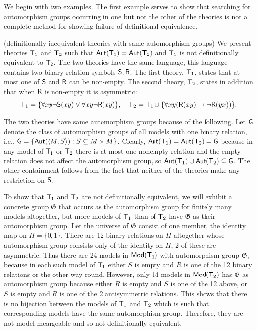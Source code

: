 \documentclass[12pt,leqno]{article}
\newcommand{\Gg}{\mbox{$\mathfrak G$}}
\newcommand{\Aut}{\mbox{\sf Aut}}
\newcommand{\T}{\mbox{\sf T}}
\newcommand{\Mod}{\mbox{\sf Mod}}
\newcommand{\R}{\mbox{\sf R}}
\newcommand{\Es}{\mbox{\sf S}}
\newcommand{\G}{\mbox{\sf G}}
\begin{document}
We begin with two examples. The first example serves to show that
searching for automorphism groups occurring in one but not the other
of the theories is not a complete method for showing failure of
definitional equivalence. %
\bigskip

(definitionally inequivalent theories
with same automorphism groups) We present theories $\T_1$ and
$\T_2$ such that $\Aut(\T_1)=\Aut(\T_2)$ and $\T_1$ is not
definitionally equivalent to $\T_2$. The two theories have the same
language, this language contains two binary relation symbols $\Es,
\R$.  The first theory, $\T_1$, states that at most one of $\Es$ and
$\R$ can be non-empty. The second theory, $\T_2$, states in addition
that when $\R$ is non-empty it is asymmetric:
\[ \T_1=\{ \forall xy\lnot\Es(xy)\lor\forall xy\lnot\R(xy)\}, \quad
\T_2=\T_1\cup\{\forall xy(\R(xy)\to\lnot\R(yx))\} .\]

The two theories have same automorphism groups because of the following. 
Let $\G$ denote
the class of automorphism groups of all models with one binary
relation, i.e., $\G=\{\Aut(\langle M,S\rangle) : S\subseteq M\times
M\}$. Clearly, $\Aut(\T_1)=\Aut(\T_2)=\G$ because in any model of
$\T_1$ or $\T_2$ there is at most one nonempty relation and the
empty relation does not affect the automorphism group, so
$\Aut(\T_1)\cup\Aut(\T_2)\subseteq\G$. The other containment follows
from the fact that neither of the theories make any restriction on
$\Es$.

To show that $\T_1$ and $\T_2$ are not definitionally equivalent, we
will exhibit a  concrete group  $\Gg$ that occurs as the
automorphism group for finitely many models altogether, but more
models of $\T_1$ than of $\T_2$ have $\Gg$ as their automorphism
group. 
Let the universe of $\Gg$ consist of one member, the identity
map on $H=\{ 0,1\}$. There are 12 binary relations on $H$ altogether
whose automorphism group consists only of the identity on $H$, 2 of
these are asymmetric. Thus there are 24 models in $\Mod(\T_1)$ with
automorphism group $\Gg$, because in each such model of $\T_1$ either $S$ is 
empty and $R$ is one of the 12 binary relations or the other way round. 
However, only 14 models in $\Mod(\T_2)$ has
$\Gg$ as automorphism group because either $R$ is empty and $S$ is one of 
the 12 above, or $S$ is empty and $R$ is one of the 2 antisymmetric relations.
This shows that there is no bijection between the models  of $\T_1$ and $\T_2$ 
which %
is such that corresponding models have the same 
automorphism group. Therefore, they 
are not model meargeable and so not definitionally equivalent. 
\end{document}
